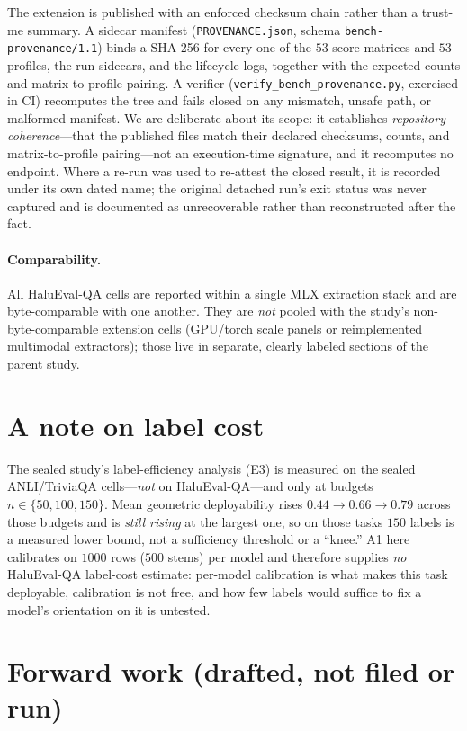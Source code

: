 \documentclass[11pt]{article}
\begin{document}
The extension is published with an enforced checksum chain rather than a trust-me summary. A sidecar
manifest (\texttt{PROVENANCE.json}, schema \texttt{bench-provenance/1.1}) binds a SHA-256 for every
one of the $53$ score matrices and $53$ profiles, the run sidecars, and the lifecycle logs, together
with the expected counts and matrix-to-profile pairing. A verifier
(\texttt{verify\_bench\_provenance.py}, exercised in CI) recomputes the tree and fails closed on any
mismatch, unsafe path, or malformed manifest. We are deliberate about its scope: it establishes
\emph{repository coherence}---that the published files match their declared checksums, counts, and
matrix-to-profile pairing---not an execution-time signature, and it recomputes no endpoint. Where a
re-run was used to re-attest the closed result, it is recorded under
its own dated name; the original detached run's exit status was never captured and is documented as
unrecoverable rather than reconstructed after the fact.

\paragraph{Comparability.} All HaluEval-QA cells are reported within a single MLX extraction stack and
are byte-comparable with one another. They are \emph{not} pooled with the study's non-byte-comparable
extension cells (GPU/torch scale panels or reimplemented multimodal extractors); those live in
separate, clearly labeled sections of the parent study.

\section{A note on label cost}

The sealed study's label-efficiency analysis (E3) is measured on the sealed ANLI/TriviaQA
cells---\emph{not} on HaluEval-QA---and only at budgets $n\in\{50,100,150\}$. Mean geometric
deployability rises $0.44\!\rightarrow\!0.66\!\rightarrow\!0.79$ across those budgets and is
\emph{still rising} at the largest one, so on those tasks $150$ labels is a measured lower bound,
not a sufficiency threshold or a ``knee.'' A1 here calibrates on $1000$ rows ($500$ stems) per
model and therefore supplies \emph{no} HaluEval-QA label-cost estimate: per-model calibration is
what makes this task deployable, calibration is not free, and how few labels would suffice to fix
a model's orientation on it is untested.

\section{Forward work (drafted, not filed or run)}
\label{sec:forward}
\end{document}
